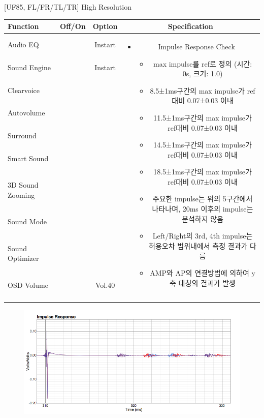 \begin{frame}[t]{[UF85, FL/FR/TL/TR] High Resolution}
\begin{tiny}
\begin{tabular}{@{}lccc@{}}
\toprule
Function & Off/On & Option & Specification \\
\midrule
Audio EQ & \color{blue}{On} & Instart &
\multirow{10}{60mm}{
\begin{itemize}
\item Impulse Response Check
  \begin{itemize}
  \item max impulse를 ref로 정의 (시간: 0s, 크기: 1.0)
  \item 8.5±1ms구간의 max impulse가 ref대비 0.07±0.03 이내
  \item 11.5±1ms구간의 max impulse가 ref대비 0.07±0.03 이내
  \item 14.5±1ms구간의 max impulse가 ref대비 0.07±0.03 이내
  \item 18.5±1ms구간의 max impulse가 ref대비 0.07±0.03 이내
  \item 주요한 impulse는 위의 5구간에서 나타나며, 20ms 이후의 impulse는 분석하지 않음
  \item Left/Right의 3rd, 4th impulse는 허용오차 범위내에서 측정 결과가 다름
  \item AMP와 AP의 연결방법에 의하여 y축 대칭의 결과가 발생
  \end{itemize}
\end{itemize}
} \\
Sound Engine & \color{blue}{On} & Instart & \\
Clearvoice & \color{black}{Off} & & \\
Autovolume & \color{black}{Off} & & \\
Surround & \color{black}{Off} & & \\
Smart Sound & \color{black}{Off} & & \\
3D Sound Zooming & \color{black}{Off} & & \\
Sound Mode & \color{blue}{On} & \color{black}{Standard} & \\
Sound Optimizer & \color{black}{Off} & & \\
OSD Volume & \color{blue}{On} & Vol.40 & \\
 & & & \\
 & & & \\
\midrule
\end{tabular}
\end{tiny}

\begin{figure}[b]
\includegraphics[height=0.4\textwidth]{figures/highresolution.png}
\end{figure}

\end{frame}

